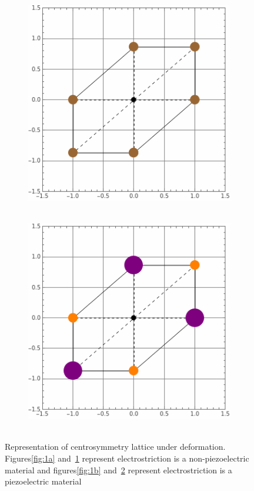 \documentclass[../main.tex]{subfiles}
\begin{document}
\begin{figure}[ht!]
    \begin{subfigure}[c]{0.45\textwidth}
        \centering
        \includegraphics[width=\textwidth]{../imgs/img2a.png}
        \caption{~}\label{fig:2a}
    \end{subfigure}
    \begin{subfigure}[c]{0.45\textwidth}
        \centering
        \includegraphics[width=\textwidth]{../imgs/img2b.png}
        \caption{~}\label{fig:2b}
    \end{subfigure}

    \caption{Representation of centrosymmetry lattice under deformation. Figures\ref{fig:1a} and~\ref{fig:2a} represent electrostriction is a non-piezoelectric material and figures\ref{fig:1b} and~\ref{fig:2b} represent electrostriction is a piezoelectric material}\label{fig:centro}
\end{figure}
\end{document}
